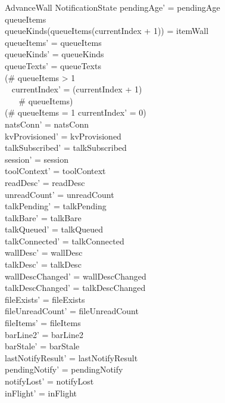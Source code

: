 \documentclass[a4paper,10pt,fleqn]{article}
\begin{document}
\begin{schema}{AdvanceWall}
  \Delta NotificationState
  \where
  pendingAge' = pendingAge \\
  queueItems \neq \langle \rangle \\
  queueKinds(queueItems(currentIndex + 1)) = itemWall \\
  queueItems' = queueItems \\
  queueKinds' = queueKinds \\
  queueTexts' = queueTexts \\
  (\# queueItems > 1 \implies \\
  \quad~ currentIndex' = (currentIndex + 1) \mod \\
  \quad~ \quad~ \# queueItems) \\
  (\# queueItems = 1 \implies
  currentIndex' = 0) \\
  natsConn' = natsConn \\
  kvProvisioned' = kvProvisioned \\
  talkSubscribed' = talkSubscribed \\
  session' = session \\
  toolContext' = toolContext \\
  readDesc' = readDesc \\
  unreadCount' = unreadCount \\
  talkPending' = talkPending \\
  talkBare' = talkBare \\
  talkQueued' = talkQueued \\
  talkConnected' = talkConnected \\
  wallDesc' = wallDesc \\
  talkDesc' = talkDesc \\
  wallDescChanged' = wallDescChanged \\
  talkDescChanged' = talkDescChanged \\
  fileExists' = fileExists \\
  fileUnreadCount' = fileUnreadCount \\
  fileItems' = fileItems \\
  barLine2' = barLine2 \\
  barStale' = barStale \\
  lastNotifyResult' = lastNotifyResult \\
  pendingNotify' = pendingNotify \\
  notifyLost' = notifyLost \\
  inFlight' = inFlight \\

\end{schema}
\end{document}
